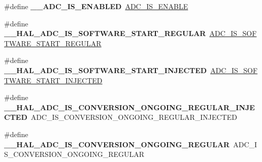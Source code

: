 \begin{DoxyCompactItemize}
\item 
\hypertarget{group___h_a_l___a_d_c___aliased___macros_ga32e5ccb7060b98a06749eb20d922d51b}{\#define {\bfseries \-\_\-\-\_\-\-A\-D\-C\-\_\-\-I\-S\-\_\-\-E\-N\-A\-B\-L\-E\-D}~\hyperlink{group___a_d_c___private___macros_gafe3a7a04ff078c62ae98b19403f696c7}{A\-D\-C\-\_\-\-I\-S\-\_\-\-E\-N\-A\-B\-L\-E}}\label{group___h_a_l___a_d_c___aliased___macros_ga32e5ccb7060b98a06749eb20d922d51b}

\item 
\hypertarget{group___h_a_l___a_d_c___aliased___macros_gad995b81efb72f4fe37152863d465bace}{\#define {\bfseries \-\_\-\-\_\-\-H\-A\-L\-\_\-\-A\-D\-C\-\_\-\-I\-S\-\_\-\-S\-O\-F\-T\-W\-A\-R\-E\-\_\-\-S\-T\-A\-R\-T\-\_\-\-R\-E\-G\-U\-L\-A\-R}~\hyperlink{group___a_d_c___private___macros_ga2ccb82ecf85d6c6d1ff2cdf9b6a82d2b}{A\-D\-C\-\_\-\-I\-S\-\_\-\-S\-O\-F\-T\-W\-A\-R\-E\-\_\-\-S\-T\-A\-R\-T\-\_\-\-R\-E\-G\-U\-L\-A\-R}}\label{group___h_a_l___a_d_c___aliased___macros_gad995b81efb72f4fe37152863d465bace}

\item 
\hypertarget{group___h_a_l___a_d_c___aliased___macros_ga5fa40578941f107c4ae1308e14266f7d}{\#define {\bfseries \-\_\-\-\_\-\-H\-A\-L\-\_\-\-A\-D\-C\-\_\-\-I\-S\-\_\-\-S\-O\-F\-T\-W\-A\-R\-E\-\_\-\-S\-T\-A\-R\-T\-\_\-\-I\-N\-J\-E\-C\-T\-E\-D}~\hyperlink{group___a_d_c___private___macros_gaa3a1c2197a097b9bb8159b6eb1ac8941}{A\-D\-C\-\_\-\-I\-S\-\_\-\-S\-O\-F\-T\-W\-A\-R\-E\-\_\-\-S\-T\-A\-R\-T\-\_\-\-I\-N\-J\-E\-C\-T\-E\-D}}\label{group___h_a_l___a_d_c___aliased___macros_ga5fa40578941f107c4ae1308e14266f7d}

\item 
\hypertarget{group___h_a_l___a_d_c___aliased___macros_ga573771917c650599112d38dc260f785b}{\#define {\bfseries \-\_\-\-\_\-\-H\-A\-L\-\_\-\-A\-D\-C\-\_\-\-I\-S\-\_\-\-C\-O\-N\-V\-E\-R\-S\-I\-O\-N\-\_\-\-O\-N\-G\-O\-I\-N\-G\-\_\-\-R\-E\-G\-U\-L\-A\-R\-\_\-\-I\-N\-J\-E\-C\-T\-E\-D}~A\-D\-C\-\_\-\-I\-S\-\_\-\-C\-O\-N\-V\-E\-R\-S\-I\-O\-N\-\_\-\-O\-N\-G\-O\-I\-N\-G\-\_\-\-R\-E\-G\-U\-L\-A\-R\-\_\-\-I\-N\-J\-E\-C\-T\-E\-D}\label{group___h_a_l___a_d_c___aliased___macros_ga573771917c650599112d38dc260f785b}

\item 
\hypertarget{group___h_a_l___a_d_c___aliased___macros_gaf6d1e4fb1fd1bca13b6c22953e805698}{\#define {\bfseries \-\_\-\-\_\-\-H\-A\-L\-\_\-\-A\-D\-C\-\_\-\-I\-S\-\_\-\-C\-O\-N\-V\-E\-R\-S\-I\-O\-N\-\_\-\-O\-N\-G\-O\-I\-N\-G\-\_\-\-R\-E\-G\-U\-L\-A\-R}~A\-D\-C\-\_\-\-I\-S\-\_\-\-C\-O\-N\-V\-E\-R\-S\-I\-O\-N\-\_\-\-O\-N\-G\-O\-I\-N\-G\-\_\-\-R\-E\-G\-U\-L\-A\-R}\label{group___h_a_l___a_d_c___aliased___macros_gaf6d1e4fb1fd1bca13b6c22953e805698}


\end{DoxyCompactItemize}
